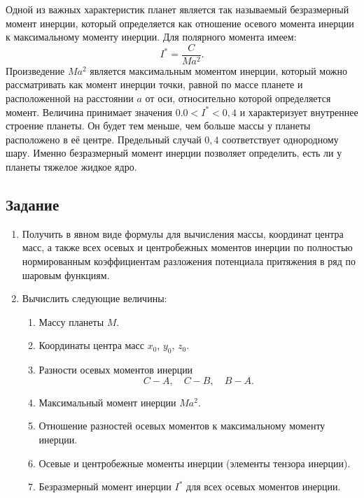 \documentclass[11pt, a4paper,addpoints]{exam}
\theoremstyle{remark}
\begin{document}
    Одной из важных характеристик планет является так называемый безразмерный момент инерции,
    который определяется как отношение осевого момента инерции к максимальному моменту инерции. Для
    полярного момента имеем:
    \begin{equation*}
        I^* = \dfrac{C}{Ma^2}.
    \end{equation*}
    Произведение $Ma^2$ является максимальным моментом инерции, который можно рассматривать как
    момент инерции точки, равной по массе планете и расположенной на расстоянии $a$ от оси,
    относительно которой определяется момент. Величина принимает значения $0.0 < I^* < 0,4$ и
    характеризует внутреннее строение планеты. Он будет тем меньше, чем больше массы у планеты
    расположено в её центре. Предельный случай $0,4$ соответствует однородному
    шару. Именно безразмерный момент инерции позволяет определить, есть ли у планеты
    тяжелое жидкое ядро. 
    \subsection*{\centering Задание}
    \begin{enumerate}
        \item Получить в явном виде формулы для вычисления массы, координат центра масс, 
            а также всех осевых и центробежных моментов
            инерции по полностью нормированным коэффициентам разложения потенциала притяжения в ряд
            по шаровым функциям.
        \item Вычислить следующие величины: 
            \begin{enumerate}
                \item Массу планеты $M$.
                \item Координаты центра масс $x_0$, $y_0$, $z_0$.
                \item Разности осевых моментов инерции
                    \begin{equation*}
                        C - A, \quad C - B, \quad B - A.
                    \end{equation*}
                \item Максимальный момент инерции $Ma^2$.
                \item Отношение разностей осевых моментов к максимальному моменту инерции.
                \item Осевые и центробежные моменты инерции (элементы тензора инерции).
                \item Безразмерный момент инерции $I^*$ для всех осевых моментов инерции.
            \end{enumerate}
    \end{enumerate}
\printbibliography
\end{document}
